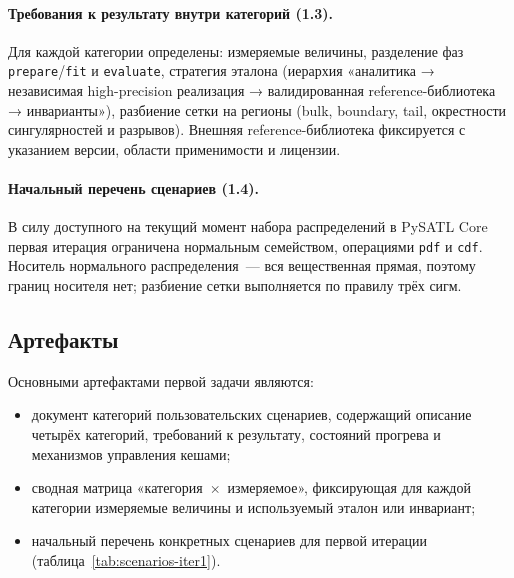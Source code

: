 \documentclass[12pt,a4paper]{article}
\begin{document}
\paragraph{Требования к результату внутри категорий (1.3).}
Для каждой категории определены: измеряемые величины,
разделение фаз \texttt{prepare}/\texttt{fit} и \texttt{evaluate},
стратегия эталона (иерархия «аналитика → независимая
high-precision реализация → валидированная reference-библиотека
→ инварианты»), разбиение сетки на регионы (bulk, boundary,
tail, окрестности сингулярностей и разрывов). Внешняя
reference-библиотека фиксируется с указанием версии, области
применимости и лицензии.

\paragraph{Начальный перечень сценариев (1.4).}
В силу доступного на текущий момент набора распределений
в PySATL Core первая итерация ограничена нормальным семейством,
операциями \texttt{pdf} и \texttt{cdf}. Носитель нормального
распределения~--- вся вещественная прямая, поэтому границ
носителя нет; разбиение сетки выполняется по правилу трёх сигм.

\subsection{Артефакты}

Основными артефактами первой задачи являются:

\begin{itemize}
  \item документ категорий пользовательских сценариев,
        содержащий описание четырёх категорий, требований
        к результату, состояний прогрева и механизмов
        управления кешами;
  \item сводная матрица «категория~$\times$~измеряемое»,
        фиксирующая для каждой категории измеряемые величины
        и используемый эталон или инвариант;
  \item начальный перечень конкретных сценариев для первой
        итерации (таблица~\ref{tab:scenarios-iter1}).
\end{itemize}
\end{document}
